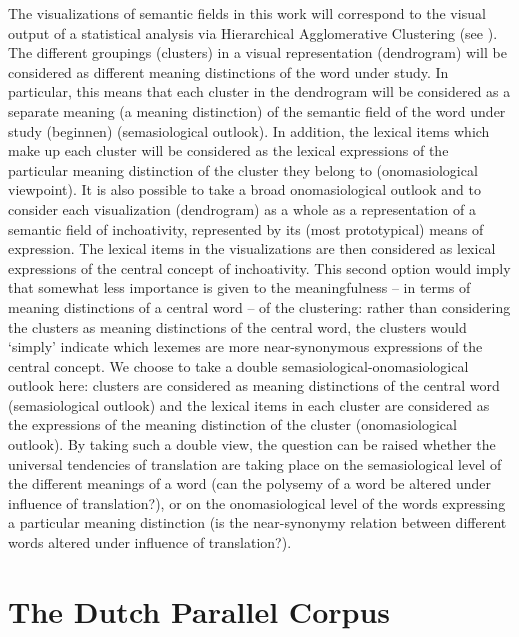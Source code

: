 The visualizations of semantic fields in this work will correspond to the visual output of a statistical analysis via Hierarchical Agglomerative Clustering (see ). The different groupings (clusters) in a visual representation (dendrogram) will be considered as different meaning distinctions of the word under study. In particular, this means that each cluster in the dendrogram will be considered as a separate meaning (a meaning distinction) of the semantic field of the word under study (beginnen) (semasiological outlook). In addition, the lexical items which make up each cluster will be considered as the lexical expressions of the particular meaning distinction of the cluster they belong to (onomasiological viewpoint). It is also possible to take a broad onomasiological outlook and to consider each visualization (dendrogram) as a whole as a representation of a semantic field of inchoativity, represented by its (most prototypical) means of expression. The lexical items in the visualizations are then considered as lexical expressions of the central concept of inchoativity. This second option would imply that somewhat less importance is given to the meaningfulness – in terms of meaning distinctions of a central word – of the clustering: rather than considering the clusters as meaning distinctions of the central word, the clusters would ‘simply’ indicate which lexemes are more near-synonymous expressions of the central concept. We choose to take a double semasiological-onomasiological outlook here: clusters are considered as meaning distinctions of the central word (semasiological outlook) and the lexical items in each cluster are considered as the expressions of the meaning distinction of the cluster (onomasiological outlook). By taking such a double view, the question can be raised whether the universal tendencies of translation are taking place on the semasiological level of the different meanings of a word (can the polysemy of a word be altered under influence of translation?), or on the onomasiological level of the words expressing a particular meaning distinction (is the near-synonymy relation between different words altered under influence of translation?).


\section{\label{sec:3.3}  The Dutch Parallel Corpus}

